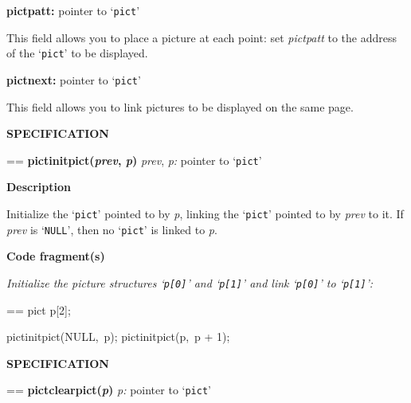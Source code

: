 \documentclass{book}
\makeatletter
\newcommand\Texinfocommandstyletextvar[1]{{\normalfont{}\textsl{#1}}}%
\newenvironment{Texinfopreformatted}{%
  \par\GNUTobeylines\obeyspaces\frenchspacing\parskip=\z@\parindent=\z@}{}
{\catcode`\^^M=13 \gdef\GNUTobeylines{\catcode`\^^M=13 \def^^M{\null\par}}}
\newenvironment{Texinfoindented}{\begin{list}{}{}\item\relax}{\end{list}}
\renewcommand{\_}{\Texinfounderscore\discretionary{}{}{}}
\makeatother
\begin{document}
\noindent{}\textbf{pict\_patt:} pointer to `\texttt{pict}'
%

This field allows you to place a picture at each point: set
\Texinfocommandstyletextvar{pict\_patt} to the address of the `\texttt{pict}' to be displayed.

\noindent{}\textbf{pict\_next:} pointer to `\texttt{pict}'
%

This field allows you to link pictures to be displayed on the same page.

\noindent{}\textbf{SPECIFICATION}
\begin{Texinfoindented}
\begin{Texinfopreformatted}%
\textbf{pict\_initpict(\Texinfocommandstyletextvar{prev}, \Texinfocommandstyletextvar{p})}
\Texinfocommandstyletextvar{prev}, \Texinfocommandstyletextvar{p:} pointer to `\texttt{pict}'
\end{Texinfopreformatted}
\end{Texinfoindented}
%
%
%
%

\noindent{}\textbf{Description}

Initialize the `\texttt{pict}' pointed to by \Texinfocommandstyletextvar{p},
linking the `\texttt{pict}' pointed to by \Texinfocommandstyletextvar{prev} to it.
If \Texinfocommandstyletextvar{prev} is `\texttt{NULL}', then no `\texttt{pict}' is linked to
\Texinfocommandstyletextvar{p}.

\noindent{}\textbf{Code fragment(s)}

\emph{Initialize the picture structures `\texttt{p[0]}'
and `\texttt{p[1]}' and link `\texttt{p[0]}' to `\texttt{p[1]}':}
\begin{Texinfoindented}
\begin{Texinfopreformatted}%
\ttfamily pict p[2];

pict\_initpict(NULL,\ p);
pict\_initpict(p,\ p + 1);
\end{Texinfopreformatted}
\end{Texinfoindented}

\noindent{}\textbf{SPECIFICATION}
\begin{Texinfoindented}
\begin{Texinfopreformatted}%
\textbf{pict\_clearpict(\Texinfocommandstyletextvar{p})}
\Texinfocommandstyletextvar{p:} pointer to `\texttt{pict}'
\end{Texinfopreformatted}
\end{Texinfoindented}
%
\end{document}
